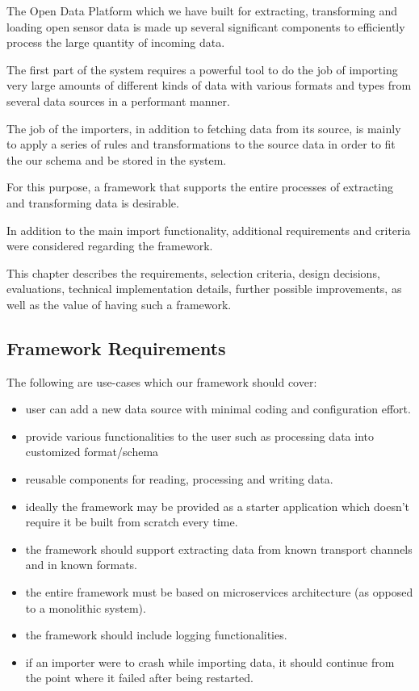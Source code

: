 The Open Data Platform which we have built for extracting, transforming
and loading open sensor data is made up several significant components
to efficiently process the large quantity of incoming data.

The first part of the system requires a powerful tool to do the job of
importing very large amounts of different kinds of data with various
formats and types from several data sources in a performant manner.

The job of the importers, in addition to fetching data from its source,
is mainly to apply a series of rules and transformations to the source
data in order to fit the our schema and be stored in the system.

For this purpose, a framework that supports the entire processes of
extracting and transforming data is desirable.

In addition to the main import functionality, additional requirements
and criteria were considered regarding the framework.

This chapter describes the requirements, selection criteria, design
decisions, evaluations, technical implementation details, further
possible improvements, as well as the value of having such a framework.

\subsection{Framework Requirements}\label{framework-requirements}

The following are use-cases which our framework should cover:

\begin{itemize}
\tightlist
\item
  user can add a new data source with minimal coding and configuration
  effort.
\item
  provide various functionalities to the user such as processing data
  into customized format/schema
\item
  reusable components for reading, processing and writing data.
\item
  ideally the framework may be provided as a starter application which
  doesn't require it be built from scratch every time.
\item
  the framework should support extracting data from known transport
  channels and in known formats.
\item
  the entire framework must be based on microservices architecture (as
  opposed to a monolithic system).
\item
  the framework should include logging functionalities.
\item
  if an importer were to crash while importing data, it should continue
  from the point where it failed after being restarted.
\end{itemize}

